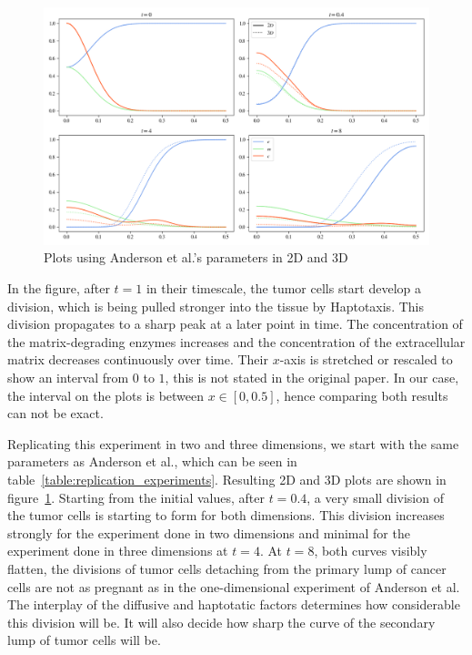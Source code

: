 \begin{figure}[ht!]
    \centering
    \includegraphics[width=\textwidth]{resources/images/1D_replication_3D.png}
    \caption{Plots using Anderson et al.'s parameters in 2D and 3D}
    \label{fig:unadjsuted_replication}
\end{figure}

In the figure, after $t=1$ in their timescale, the tumor cells start develop a division, which is being pulled stronger into the tissue by Haptotaxis. This division propagates to a sharp peak at a later point in time. The concentration of the matrix-degrading enzymes increases and the concentration of the extracellular matrix decreases continuously over time. Their $x$-axis is stretched or rescaled to show an interval from $0$ to $1$, this is not stated in the original paper. In our case, the interval on the plots is between $x\in[0,0.5]$, hence comparing both results can not be exact.

Replicating this experiment in two and three dimensions, we start with the same parameters as Anderson et al., which can be seen in table~\ref{table:replication_experiments}. Resulting 2D and 3D plots are shown in figure~\ref{fig:unadjsuted_replication}. Starting from the initial values, after $t=0.4$, a very small division of the tumor cells is starting to form for both dimensions. This division increases strongly for the experiment done in two dimensions and minimal for the experiment done in three dimensions at $t=4$. At $t=8$, both curves visibly flatten, the divisions of tumor cells detaching from the primary lump of cancer cells are not as pregnant as in the one-dimensional experiment of Anderson et al. The interplay of the diffusive and haptotatic factors determines how considerable this division will be. It will also decide how sharp the curve of the secondary lump of tumor cells will be.

